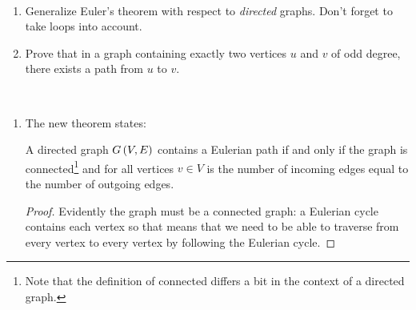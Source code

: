 \documentclass{article}
\begin{document}
\begin{exercise}~~
\begin{enumerate}
 \item Generalize Euler's theorem with respect to \emph{directed} graphs. Don't forget to take loops into account.
 \item Prove that in a graph containing exactly two vertices $u$ and $v$ of odd degree, there exists a path from $u$ to $v$.
\end{enumerate}
\begin{answer}~~
\begin{enumerate}
 \item The new theorem states:
 \begin{theorem}
  A directed graph $G\left( V,E \right)$ contains a Eulerian path if and only if the graph is connected\footnote{Note that the definition of connected differs a bit in the context of a directed graph.} and for all vertices $v\in V$ is the number of incoming edges equal to the number of outgoing edges.
 \end{theorem}
 \begin{proof}
  Evidently the graph must be a connected graph: a Eulerian cycle contains each vertex so that means that we need to be able to traverse from every vertex to every vertex by following the Eulerian cycle.

\end{proof}
\end{enumerate}
\end{answer}
\end{exercise}
\end{document}
